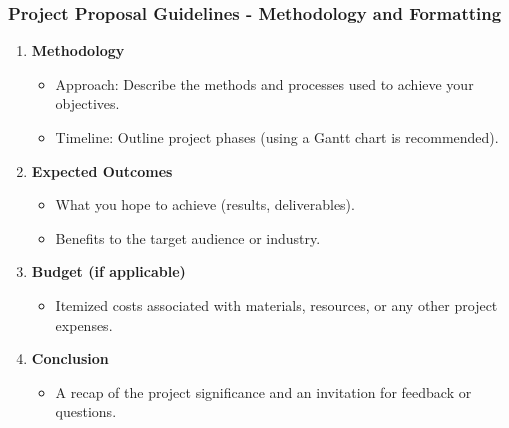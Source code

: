 \documentclass[aspectratio=169]{beamer}
\begin{document}
\begin{frame}[fragile]
  \frametitle{Project Proposal Guidelines - Methodology and Formatting}
  \begin{enumerate}[resume]
    \item \textbf{Methodology}
      \begin{itemize}
        \item Approach: Describe the methods and processes used to achieve your objectives.
        \item Timeline: Outline project phases (using a Gantt chart is recommended).
      \end{itemize}

    \item \textbf{Expected Outcomes}
      \begin{itemize}
        \item What you hope to achieve (results, deliverables).
        \item Benefits to the target audience or industry.
      \end{itemize}

    \item \textbf{Budget (if applicable)}
      \begin{itemize}
        \item Itemized costs associated with materials, resources, or any other project expenses.
      \end{itemize}

    \item \textbf{Conclusion}
      \begin{itemize}
        \item A recap of the project significance and an invitation for feedback or questions.
      \end{itemize}
  \end{enumerate}
\end{frame}
\end{document}
